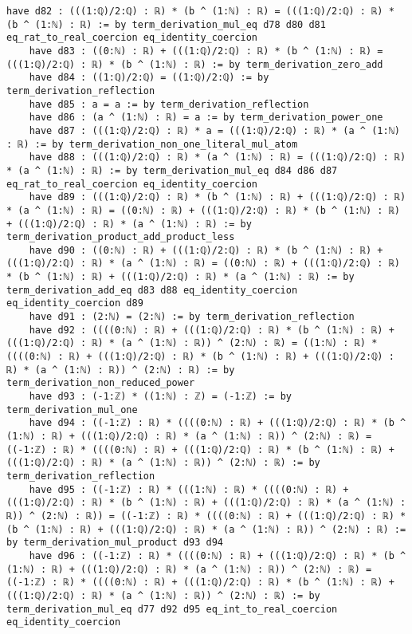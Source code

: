 \documentclass{article}
\begin{document}
\begin{tcolorbox}[colback=white!10, width=\linewidth]
\begin{lstlisting}[language=Lean4]
    have d82 : (((1:ℚ)/2:ℚ) : ℝ) * (b ^ (1:ℕ) : ℝ) = (((1:ℚ)/2:ℚ) : ℝ) * (b ^ (1:ℕ) : ℝ) := by term_derivation_mul_eq d78 d80 d81 eq_rat_to_real_coercion eq_identity_coercion
    have d83 : ((0:ℕ) : ℝ) + (((1:ℚ)/2:ℚ) : ℝ) * (b ^ (1:ℕ) : ℝ) = (((1:ℚ)/2:ℚ) : ℝ) * (b ^ (1:ℕ) : ℝ) := by term_derivation_zero_add
    have d84 : ((1:ℚ)/2:ℚ) = ((1:ℚ)/2:ℚ) := by term_derivation_reflection
    have d85 : a = a := by term_derivation_reflection
    have d86 : (a ^ (1:ℕ) : ℝ) = a := by term_derivation_power_one
    have d87 : (((1:ℚ)/2:ℚ) : ℝ) * a = (((1:ℚ)/2:ℚ) : ℝ) * (a ^ (1:ℕ) : ℝ) := by term_derivation_non_one_literal_mul_atom
    have d88 : (((1:ℚ)/2:ℚ) : ℝ) * (a ^ (1:ℕ) : ℝ) = (((1:ℚ)/2:ℚ) : ℝ) * (a ^ (1:ℕ) : ℝ) := by term_derivation_mul_eq d84 d86 d87 eq_rat_to_real_coercion eq_identity_coercion
    have d89 : (((1:ℚ)/2:ℚ) : ℝ) * (b ^ (1:ℕ) : ℝ) + (((1:ℚ)/2:ℚ) : ℝ) * (a ^ (1:ℕ) : ℝ) = ((0:ℕ) : ℝ) + (((1:ℚ)/2:ℚ) : ℝ) * (b ^ (1:ℕ) : ℝ) + (((1:ℚ)/2:ℚ) : ℝ) * (a ^ (1:ℕ) : ℝ) := by term_derivation_product_add_product_less
    have d90 : ((0:ℕ) : ℝ) + (((1:ℚ)/2:ℚ) : ℝ) * (b ^ (1:ℕ) : ℝ) + (((1:ℚ)/2:ℚ) : ℝ) * (a ^ (1:ℕ) : ℝ) = ((0:ℕ) : ℝ) + (((1:ℚ)/2:ℚ) : ℝ) * (b ^ (1:ℕ) : ℝ) + (((1:ℚ)/2:ℚ) : ℝ) * (a ^ (1:ℕ) : ℝ) := by term_derivation_add_eq d83 d88 eq_identity_coercion eq_identity_coercion d89
    have d91 : (2:ℕ) = (2:ℕ) := by term_derivation_reflection
    have d92 : ((((0:ℕ) : ℝ) + (((1:ℚ)/2:ℚ) : ℝ) * (b ^ (1:ℕ) : ℝ) + (((1:ℚ)/2:ℚ) : ℝ) * (a ^ (1:ℕ) : ℝ)) ^ (2:ℕ) : ℝ) = ((1:ℕ) : ℝ) * ((((0:ℕ) : ℝ) + (((1:ℚ)/2:ℚ) : ℝ) * (b ^ (1:ℕ) : ℝ) + (((1:ℚ)/2:ℚ) : ℝ) * (a ^ (1:ℕ) : ℝ)) ^ (2:ℕ) : ℝ) := by term_derivation_non_reduced_power
    have d93 : (-1:ℤ) * ((1:ℕ) : ℤ) = (-1:ℤ) := by term_derivation_mul_one
    have d94 : ((-1:ℤ) : ℝ) * ((((0:ℕ) : ℝ) + (((1:ℚ)/2:ℚ) : ℝ) * (b ^ (1:ℕ) : ℝ) + (((1:ℚ)/2:ℚ) : ℝ) * (a ^ (1:ℕ) : ℝ)) ^ (2:ℕ) : ℝ) = ((-1:ℤ) : ℝ) * ((((0:ℕ) : ℝ) + (((1:ℚ)/2:ℚ) : ℝ) * (b ^ (1:ℕ) : ℝ) + (((1:ℚ)/2:ℚ) : ℝ) * (a ^ (1:ℕ) : ℝ)) ^ (2:ℕ) : ℝ) := by term_derivation_reflection
    have d95 : ((-1:ℤ) : ℝ) * (((1:ℕ) : ℝ) * ((((0:ℕ) : ℝ) + (((1:ℚ)/2:ℚ) : ℝ) * (b ^ (1:ℕ) : ℝ) + (((1:ℚ)/2:ℚ) : ℝ) * (a ^ (1:ℕ) : ℝ)) ^ (2:ℕ) : ℝ)) = ((-1:ℤ) : ℝ) * ((((0:ℕ) : ℝ) + (((1:ℚ)/2:ℚ) : ℝ) * (b ^ (1:ℕ) : ℝ) + (((1:ℚ)/2:ℚ) : ℝ) * (a ^ (1:ℕ) : ℝ)) ^ (2:ℕ) : ℝ) := by term_derivation_mul_product d93 d94
    have d96 : ((-1:ℤ) : ℝ) * ((((0:ℕ) : ℝ) + (((1:ℚ)/2:ℚ) : ℝ) * (b ^ (1:ℕ) : ℝ) + (((1:ℚ)/2:ℚ) : ℝ) * (a ^ (1:ℕ) : ℝ)) ^ (2:ℕ) : ℝ) = ((-1:ℤ) : ℝ) * ((((0:ℕ) : ℝ) + (((1:ℚ)/2:ℚ) : ℝ) * (b ^ (1:ℕ) : ℝ) + (((1:ℚ)/2:ℚ) : ℝ) * (a ^ (1:ℕ) : ℝ)) ^ (2:ℕ) : ℝ) := by term_derivation_mul_eq d77 d92 d95 eq_int_to_real_coercion eq_identity_coercion

\end{lstlisting}
\end{tcolorbox}
\end{document}
